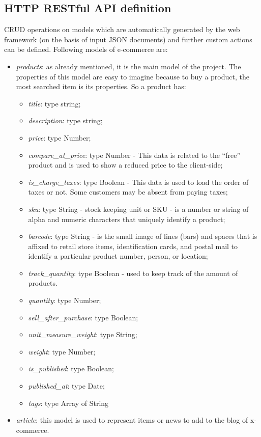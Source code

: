 \subsection{HTTP RESTful API definition}
CRUD operations on models which are automatically generated by the web framework (on the basis of input JSON documents) and further custom actions can be defined. Following models of e-commerce are:
\begin{itemize}
\item \emph{products}: as already mentioned, it is the main model of the project. The properties of this model are easy to imagine because to buy a product, the most searched item is its properties. So a product has:
\begin{itemize}
\item \emph{title}: type string;
\item \emph{description}: type string;
\item \emph{price}: type Number;
\item \emph{compare\_at\_price}: type Number - This data is related to the “free” product and is used to show a reduced price to the client-side;
\item \emph{is\_charge\_taxes}: type Boolean - This data is used to load the order of taxes or not. Some customers may be absent from paying taxes;
\item \emph{sku}: type String - stock keeping unit or SKU - is a number or string of alpha and numeric characters that uniquely identify a product;
\item \emph{barcode}: type String - is the small image of lines (bars) and spaces that is affixed to retail store items, identification cards, and postal mail to identify a particular product number, person, or location;
\item \emph{track\_quantity}: type Boolean - used to keep track of the amount of products.
\item \emph{quantity}: type Number;
\item \emph{sell\_after\_purchase}: type Boolean;
\item \emph{unit\_measure\_weight}: type String;
\item \emph{weight}: type Number;
\item \emph{is\_published}: type Boolean;
\item \emph{published\_at}: type Date;
\item \emph{tags}: type Array of String
\end{itemize}
\item \emph{article}: this model is used to represent items or news to add to the blog of x-commerce.

\end{itemize}
